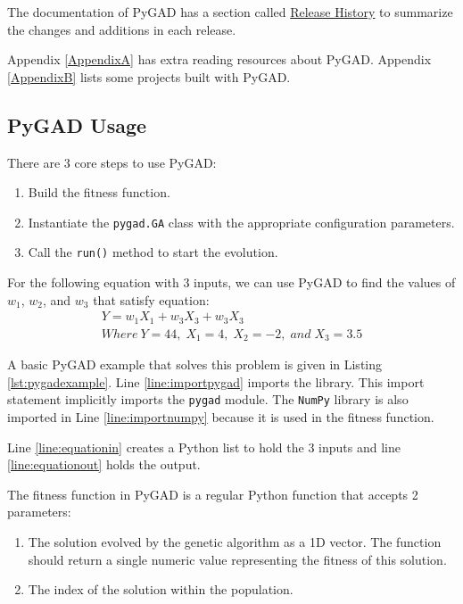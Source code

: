 \documentclass[conference]{IEEEtran}
\begin{document}
The documentation of PyGAD has a section called \href{https://pygad.readthedocs.io/en/latest/Footer.html#release-history}{Release History} to summarize the changes and additions in each release.

Appendix \ref{AppendixA} has extra reading resources about PyGAD. Appendix \ref{AppendixB} lists some projects built with PyGAD.

\subsection{PyGAD Usage}
\label{pygadusage}

There are 3 core steps to use PyGAD:
\begin{enumerate}
    \item Build the fitness function.
    \item Instantiate the \texttt{pygad.GA} class with the appropriate configuration parameters.
    \item Call the \texttt{run()} method to start the evolution.
\end{enumerate}

For the following equation with 3 inputs, we can use PyGAD to find the values of $w_1$, $w_2$, and $w_3$ that satisfy equation:
\begin{gather*}
    Y = w_1X_1 + w_3X_3 + w_3X_3 \\
    Where \: Y=44, \; X_1=4, \; X_2=-2, \; and \; X_3=3.5
\end{gather*}

A basic PyGAD example that solves this problem is given in Listing \ref{lst:pygadexample}. Line \ref{line:importpygad} imports the library. This import statement implicitly imports the \texttt{pygad} module. The \texttt{NumPy} library is also imported in Line \ref{line:importnumpy} because it is used in the fitness function.

Line \ref{line:equationin} creates a Python list to hold the 3 inputs and line \ref{line:equationout} holds the output.

The fitness function in PyGAD is a regular Python function that accepts 2 parameters:
\begin{enumerate}
    \item The solution evolved by the genetic algorithm as a 1D vector. The function should return a single numeric value representing the fitness of this solution.
    \item The index of the solution within the population.
\end{enumerate}
\end{document}
